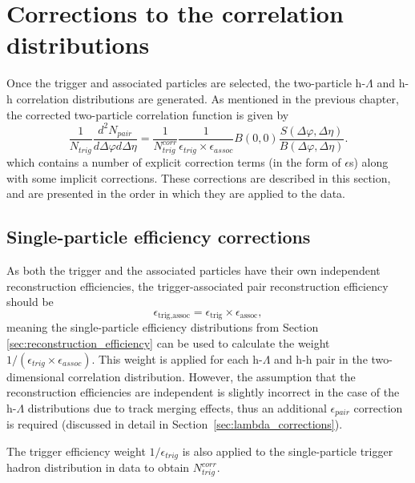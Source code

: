 \clearpage 

\section{Corrections to the correlation distributions}
\label{sec:corrections}

Once the trigger and associated particles are selected, the two-particle h-$\Lambda$ and h-h correlation distributions are generated. As mentioned in the previous chapter, the corrected two-particle correlation function is given by
%
\begin{equation}
    \frac{1}{N_{trig}}\frac{d^2N_{pair}}{d\Delta\varphi d\Delta\eta} = \frac{1}{N_{trig}^{corr}}\frac{1}{\epsilon_{trig}\times\epsilon_{assoc}}B(0,0)\frac{S(\Delta\varphi, \Delta\eta)}{B(\Delta\varphi, \Delta\eta)}.
\label{eq:corr_detector}
\end{equation}
%
which contains a number of explicit correction terms (in the form of $\epsilon$s) along with some implicit corrections. These corrections are described in this section, and are presented in the order in which they are applied to the data.

\subsection{Single-particle efficiency corrections}
\label{sec:single_particle_corr}

As both the trigger and the associated particles have their own independent reconstruction efficiencies, the trigger-associated pair reconstruction efficiency should be
%
\begin{equation}
	\epsilon_{\text{trig}, \text{assoc}} = \epsilon_{\text{trig}}\times\epsilon_{\text{assoc}},
\end{equation} 
%
meaning the single-particle efficiency distributions from Section \ref{sec:reconstruction_efficiency} can be used to calculate the weight $1/(\epsilon_{trig}\times\epsilon_{assoc})$. This weight is applied for each h-$\Lambda$ and h-h pair in the two-dimensional correlation distribution. However, the assumption that the reconstruction efficiencies are independent is slightly incorrect in the case of the h-$\Lambda$ distributions due to track merging effects, thus an additional $\epsilon_{pair}$ correction is required (discussed in detail in Section~\ref{sec:lambda_corrections}).

The trigger efficiency weight $1/\epsilon_{trig}$ is also applied to the single-particle trigger hadron distribution in data to obtain $N_{trig}^{corr}$. 

